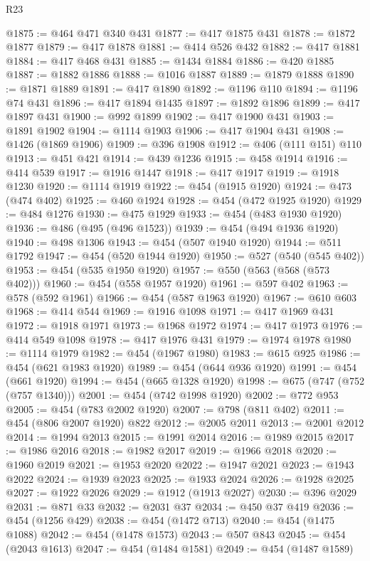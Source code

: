 \begin{lexlean}{R23}
\begin{coremodule}
@1875 := @464 @471 @340 @431
@1877 := @417 @1875 @431
@1878 := @1872 @1877
@1879 := @417 @1878
@1881 := @414 @526 @432
@1882 := @417 @1881
@1884 := @417 @468 @431
@1885 := @1434 @1884
@1886 := @420 @1885
@1887 := @1882 @1886
@1888 := @1016 @1887
@1889 := @1879 @1888
@1890 := @1871 @1889
@1891 := @417 @1890
@1892 := @1196 @110
@1894 := @1196 @74 @431
@1896 := @417 @1894 @1435
@1897 := @1892 @1896
@1899 := @417 @1897 @431
@1900 := @992 @1899
@1902 := @417 @1900 @431
@1903 := @1891 @1902
@1904 := @1114 @1903
@1906 := @417 @1904 @431
@1908 := @1426 (@1869 @1906)
@1909 := @396 @1908
@1912 := @406 (@111 @151) @110
@1913 := @451 @421
@1914 := @439 @1236
@1915 := @458 @1914
@1916 := @414 @539
@1917 := @1916 @1447
@1918 := @417 @1917
@1919 := @1918 @1230
@1920 := @1114 @1919
@1922 := @454 (@1915 @1920)
@1924 := @473 (@474 @402)
@1925 := @460 @1924
@1928 := @454 (@472 @1925 @1920)
@1929 := @484 @1276
@1930 := @475 @1929
@1933 := @454 (@483 @1930 @1920)
@1936 := @486 (@495 (@496 @1523))
@1939 := @454 (@494 @1936 @1920)
@1940 := @498 @1306
@1943 := @454 (@507 @1940 @1920)
@1944 := @511 @1792
@1947 := @454 (@520 @1944 @1920)
@1950 := @527 (@540 (@545 @402))
@1953 := @454 (@535 @1950 @1920)
@1957 := @550 (@563 (@568 (@573 @402)))
@1960 := @454 (@558 @1957 @1920)
@1961 := @597 @402
@1963 := @578 (@592 @1961)
@1966 := @454 (@587 @1963 @1920)
@1967 := @610 @603
@1968 := @414 @544
@1969 := @1916 @1098
@1971 := @417 @1969 @431
@1972 := @1918 @1971
@1973 := @1968 @1972
@1974 := @417 @1973
@1976 := @414 @549 @1098
@1978 := @417 @1976 @431
@1979 := @1974 @1978
@1980 := @1114 @1979
@1982 := @454 (@1967 @1980)
@1983 := @615 @925
@1986 := @454 (@621 @1983 @1920)
@1989 := @454 (@644 @936 @1920)
@1991 := @454 (@661 @1920)
@1994 := @454 (@665 @1328 @1920)
@1998 := @675 (@747 (@752 (@757 @1340)))
@2001 := @454 (@742 @1998 @1920)
@2002 := @772 @953
@2005 := @454 (@783 @2002 @1920)
@2007 := @798 (@811 @402)
@2011 := @454 (@806 @2007 @1920) @822
@2012 := @2005 @2011
@2013 := @2001 @2012
@2014 := @1994 @2013
@2015 := @1991 @2014
@2016 := @1989 @2015
@2017 := @1986 @2016
@2018 := @1982 @2017
@2019 := @1966 @2018
@2020 := @1960 @2019
@2021 := @1953 @2020
@2022 := @1947 @2021
@2023 := @1943 @2022
@2024 := @1939 @2023
@2025 := @1933 @2024
@2026 := @1928 @2025
@2027 := @1922 @2026
@2029 := @1912 (@1913 @2027)
@2030 := @396 @2029
@2031 := @871 @33
@2032 := @2031 @37
@2034 := @450 @37 @419
@2036 := @454 (@1256 @429)
@2038 := @454 (@1472 @713)
@2040 := @454 (@1475 @1088)
@2042 := @454 (@1478 @1573)
@2043 := @507 @843
@2045 := @454 (@2043 @1613)
@2047 := @454 (@1484 @1581)
@2049 := @454 (@1487 @1589)

\end{coremodule}
\end{lexlean}
